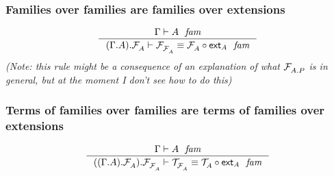 \subsubsection{Families over families are families over extensions}
\begin{equation*}
\inference
  { \jfam{\Gamma}{A}
    }
  { \jfameq
      {{{\Gamma}{A}}{\mfam{A}}}
      {\mfam{\mfam{A}}}
      {\jcomp{{A}{\mfam{A}}}{\tfext{A}}{\mfam{A}}}
    }
\end{equation*}
\emph{(Note: this rule might be a consequence of an explanation of what $\mfam{{A}{P}}$
is in general, but at the moment I don't see how to do this)}

\subsubsection{Terms of families over families are terms of families over extensions}
\begin{equation*}
\inference
  { \jfam{\Gamma}{A}
    }
  { \jfameq
      {{{{\Gamma}{A}}{\mfam{A}}}{\mfam{\mfam{A}}}}
      {\mtm{\mfam{A}}}
      {\jcomp{}{\tfext{A}}{\mtm{A}}}
      }
\end{equation*}

